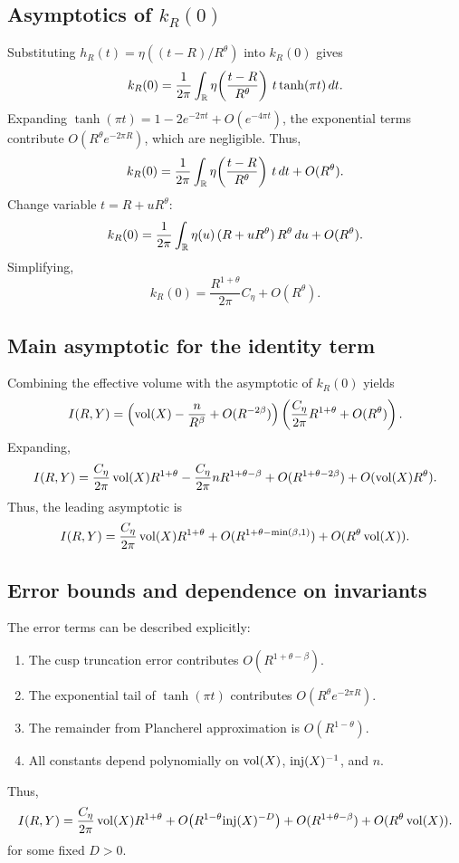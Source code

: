 \subsection{Asymptotics of $k_R(0)$}\label{subsec:identity-k0}

Substituting $h_R(t) = \eta((t-R)/R^\theta)$ into $k_R(0)$ gives
\[
k_R(0) = \frac{1}{2\pi}\int_{\mathbb{R}} \eta\!\left(\frac{t-R}{R^\theta}\right)\,t\tanh(\pi t)\,dt.
\]
Expanding $\tanh(\pi t) = 1 - 2e^{-2\pi t} + O(e^{-4\pi t})$, the exponential terms contribute $O(R^\theta e^{-2\pi R})$, which are negligible. Thus,
\[
k_R(0) = \frac{1}{2\pi}\int_{\mathbb{R}} \eta\!\left(\frac{t-R}{R^\theta}\right)\,t\,dt + O(R^\theta).
\]
Change variable $t=R+uR^\theta$:
\[
k_R(0) = \frac{1}{2\pi}\int_{\mathbb{R}} \eta(u)\,(R+uR^\theta)\,R^\theta\,du + O(R^\theta).
\]
Simplifying,
\[
k_R(0) = \frac{R^{1+\theta}}{2\pi}C_\eta + O(R^\theta).
\]

\subsection{Main asymptotic for the identity term}\label{subsec:identity-main}

Combining the effective volume with the asymptotic of $k_R(0)$ yields
\[
I(R,Y) = \left(\operatorname{vol}(X) - \frac{n}{R^\beta} + O(R^{-2\beta})\right)\left(\frac{C_\eta}{2\pi}R^{1+\theta} + O(R^\theta)\right).
\]
Expanding,
\[
I(R,Y) = \frac{C_\eta}{2\pi}\operatorname{vol}(X)R^{1+\theta} - \frac{C_\eta}{2\pi}n R^{1+\theta-\beta} + O(R^{1+\theta-2\beta}) + O(\operatorname{vol}(X)R^\theta).
\]
Thus, the leading asymptotic is
\[
I(R,Y) = \frac{C_\eta}{2\pi}\operatorname{vol}(X)R^{1+\theta} + O(R^{1+\theta-\min(\beta,1)}) + O(R^\theta\operatorname{vol}(X)).
\]

\subsection{Error bounds and dependence on invariants}\label{subsec:identity-errors}

The error terms can be described explicitly:
\begin{enumerate}
\item The cusp truncation error contributes $O(R^{1+\theta-\beta})$.
\item The exponential tail of $\tanh(\pi t)$ contributes $O(R^\theta e^{-2\pi R})$.
\item The remainder from Plancherel approximation is $O(R^{1-\theta})$.
\item All constants depend polynomially on $\operatorname{vol}(X)$, $\mathrm{inj}(X)^{-1}$, and $n$.
\end{enumerate}
Thus,
\[
I(R,Y) = \frac{C_\eta}{2\pi}\operatorname{vol}(X)R^{1+\theta} + O\!\left(R^{1-\theta}\mathrm{inj}(X)^{-D}\right) + O(R^{1+\theta-\beta}) + O(R^\theta\operatorname{vol}(X)).
\]
for some fixed $D>0$.

